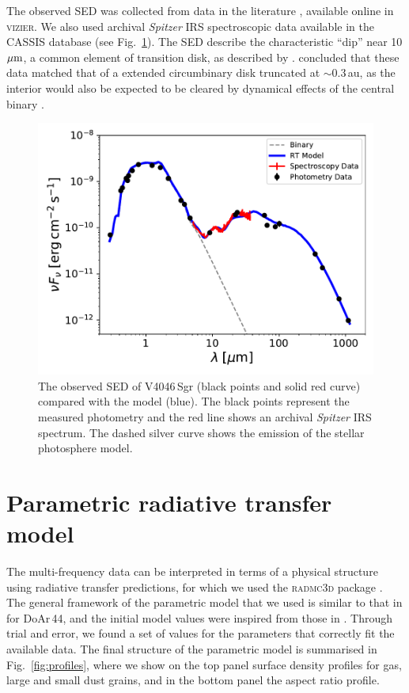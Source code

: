 \documentclass[fleqn,usenatbib,useAMS]{mnras}
\begin{document}
The observed SED was collected from data in the literature \citep{1988iras....7.....H, 1990A&A...234..230H, Jensen_97, 2000A&A...355L..27H, 2001KFNT...17..409K, 2003yCat.2246....0C, 2007PASJ...59S.369M, 2008PASP..120.1128O, 2010A&A...514A...1I, 2012yCat.2311....0C}, available online in \textsc{vizier}. We also  used  archival \textit{Spitzer} IRS spectroscopic data available in the CASSIS database \citep{Lebouteiller_2015} (see Fig.~\ref{fig:SED}). The SED describe the characteristic “dip” near 10 $\hbox{$\mu$m}$, a common element of transition disk, as described by \citet{Rosenfeld_2013}. \citet{Jensen_97} concluded that these data matched that of a extended circumbinary disk truncated at $\sim$0.3\,au, as the interior would also be expected to be cleared by dynamical effects of the central binary \citep{Art_Lu}.

\begin{figure}
	\centering
	\includegraphics[width=\columnwidth]{SED_.pdf}
    \caption{The observed SED of V4046\,Sgr (black points and solid red curve) compared with the model (blue). The black points represent the measured photometry and the red line shows an archival \textit{Spitzer} IRS spectrum. The dashed silver curve shows the emission of the stellar photosphere model.}
    \label{fig:SED}
\end{figure}

\section{Parametric radiative transfer model} \label{sec:model}

The multi-frequency data can be interpreted in terms of a physical structure using radiative transfer predictions, for which we used the \textsc{radmc3d} package \citep{Dullemond_2012}. The general framework of the parametric model that we used is similar to that in \citet{2018MNRAS.477.5104C} for DoAr\,44, and the initial model values were inspired from those in \citet{Rosenfeld_2013}. Through trial and error, we found a set of values for the parameters that correctly fit the available data. The final structure of the parametric model is summarised in  Fig.~\ref{fig:profiles}, where we show on the top panel surface density profiles for gas, large and small dust grains, and in the bottom panel the aspect ratio profile.
\end{document}
